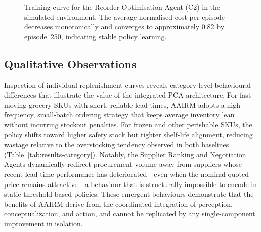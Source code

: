 \documentclass[utf8]{FrontiersinHarvard}
\begin{document}
	\begin{figure}[htbp]
		\centering
		\caption{Training curve for the Reorder Optimisation Agent (C2)
			in the simulated environment.  The average normalised cost per
			episode decreases monotonically and converges to approximately
			0.82 by episode~250, indicating stable policy learning.}
		\label{fig:rl-training}
	\end{figure}

	\subsection{Qualitative Observations}

	Inspection of individual replenishment curves reveals category-level
	behavioural differences that illustrate the value of the integrated PCA
	architecture.  For fast-moving grocery SKUs with short, reliable lead
	times, AAIRM adopts a high-frequency, small-batch ordering strategy that
	keeps average inventory lean without incurring stockout penalties.  For
	frozen and other perishable SKUs, the policy shifts toward higher safety
	stock but tighter shelf-life alignment, reducing wastage relative to the
	overstocking tendency observed in both baselines (Table~\ref{tab:results-category}).
	Notably, the Supplier Ranking and Negotiation Agents dynamically redirect
	procurement volume away from suppliers whose recent lead-time performance
	has deteriorated---even when the nominal quoted price remains
	attractive---a behaviour that is structurally impossible to encode in static
	threshold-based policies.  These emergent behaviours demonstrate that the
	benefits of AAIRM derive from the coordinated integration of perception,
	conceptualization, and action, and cannot be replicated by any
	single-component improvement in isolation.
\end{document}
